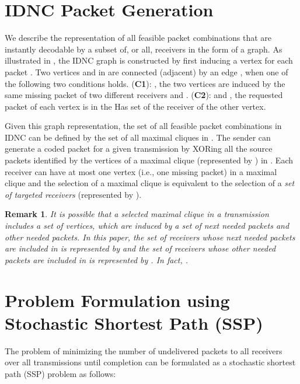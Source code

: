 \documentclass[12pt, peerreview, onecolumn]{IEEEtran}
\begin{document}
\vspace{-5mm}
\section{IDNC Packet Generation} \label{graph}
We describe the representation of all  feasible packet combinations that are instantly decodable by a subset of, or  all,  receivers   in the form of a graph. As illustrated in \cite{sorour2010decoding,sorour2012completion}, the IDNC graph  is constructed  by first inducing a vertex  for each packet . Two vertices  and  in   are connected (adjacent)  by an edge , when one of the following two conditions holds. (\textbf{C1}): , the two vertices are induced by the same missing  packet  of two different receivers  and . (\textbf{C2}):  and , the requested packet of each vertex is in the Has set of the receiver of the other vertex.

Given this graph representation, the set of all feasible packet combinations in IDNC  can be defined by the set of all maximal cliques in  \cite{sorour2010decoding,sorour2012completion}. The sender can generate a coded  packet for a given transmission by XORing all the source packets identified by the vertices of a  maximal clique (represented by ) in .  Each receiver can have at most one vertex (i.e., one missing packet) in a maximal clique and  the selection of a maximal clique    is equivalent to  the selection of a \emph{set of targeted receivers }(represented by ). 

\newtheorem{remark}{\textbf{Remark}}
\begin{remark}
It is possible that a  selected maximal clique  in a transmission includes a set of vertices, which are induced by a set of next needed packets and other needed packets. In this paper, the set of receivers  whose \emph{next needed packets} are included in   is represented   by   and the set of receivers whose  other \emph{needed packets} are included in   is represented  by . In fact, .
\end{remark}





\vspace{-5mm}
\section{Problem Formulation using Stochastic Shortest Path (SSP)} \label{problem formulation}

The  problem of minimizing the  number of undelivered packets to all receivers over all transmissions until completion  can be formulated as  a stochastic shortest path (SSP) problem as follows:
\end{document}
